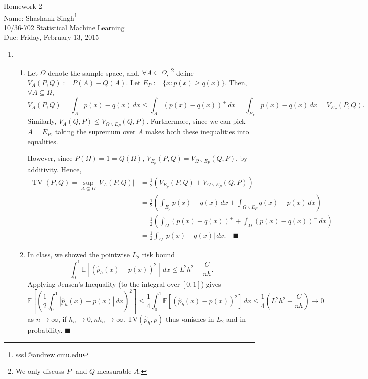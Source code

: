 \documentclass[11pt]{article}
\makeatletter
\newcommand{\myname}{Shashank Singh\footnote{sss1@andrew.cmu.edu}}
\newcommand{\myclass}{10/36-702 Statistical Machine Learning}
\newcommand{\myhwnum}{2}
\newcommand{\duedate}{Friday, February 13, 2015}
\renewcommand{\qed}{\quad \ensuremath{\blacksquare}}
\newcommand{\sminus}{\backslash}
\newcommand{\E}{\mathbb{E}} %
\makeatother
\begin{document}
\thispagestyle{plain}

{\Large Homework \myhwnum} \\
Name: \myname \\
\myclass \\
Due: \duedate


\begin{enumerate}
\item
\begin{enumerate}
\item Let $\Omega$ denote the sample space, and, $\forall A \subseteq \Omega$,
\footnote{We only discuss $P$- and $Q$-measurable $A$.}
define $V_A(P,Q) := P(A) - Q(A)$. Let $E_P := \{x : p(x) \geq q(x)\}$. Then,
$\forall A \subseteq \Omega$,
\[V_A(P,Q)
    = \int_A p(x) - q(x) \, dx
    \leq \int_A (p(x) - q(x))^+ \, dx
    = \int_{E_P} p(x) - q(x) \, dx
    = V_{E_P}(P,Q).
\]
Similarly, $V_A(Q,P) \leq V_{\Omega \sminus E_P}(Q,P)$. Furthermore, since we
can pick $A = E_P$, taking the supremum over $A$ makes both these inequalities
into equalities.

However, since
$P(\Omega) = 1 = Q(\Omega)$, $V_{E_p}(P,Q) = V_{\Omega \sminus E_P}(Q,P)$, by
additivity. Hence,
\begin{align*}
\operatorname{TV}(P,Q)
    = \sup_{A \subseteq \Omega} |V_A(P,Q)|
 &  = \frac{1}{2} \left( V_{E_p}(P,Q) + V_{\Omega \sminus E_P}(Q,P) \right) \\
 &  = \frac{1}{2} \left( \int_{E_p} p(x) - q(x) \, dx
                    + \int_{\Omega \sminus E_P} q(x) - p(x) \, dx \right)   \\
 &  = \frac{1}{2} \left( \int_\Omega (p(x) - q(x))^+
                                + \int_\Omega (p(x) - q(x))^- \, dx \right) \\
 &  = \frac{1}{2} \int_\Omega |p(x) - q(x)| \, dx. \qed
\end{align*}

\item In class, we showed the pointwise $L_2$ risk bound
\[\int_0^1 \E\left[ \left( \hat p_h(x) - p(x) \right)^2 \right] \, dx
    \leq L^2h^2 + \frac{C}{nh}.\]
Applying Jensen's Inequality (to the integral over $[0,1]$) gives
\[\E\left[ \left(
        \frac{1}{2} \int_0^1 |\hat p_h(x) - p(x)| \, dx
    \right)^2 \right]
    \leq \frac{1}{4}
            \int_0^1 \E\left[ \left( \hat p_h(x) - p(x) \right)^2 \right] \, dx
    \leq \frac{1}{4} \left( L^2h^2 + \frac{C}{nh} \right)
    \to 0\]
as $n \to \infty$, if $h_n \to 0, nh_n \to \infty$.
TV$(\hat p_h,p)$ thus vanishes in $L_2$ and in probability. \qed
\end{enumerate}


\end{enumerate}
\end{document}
